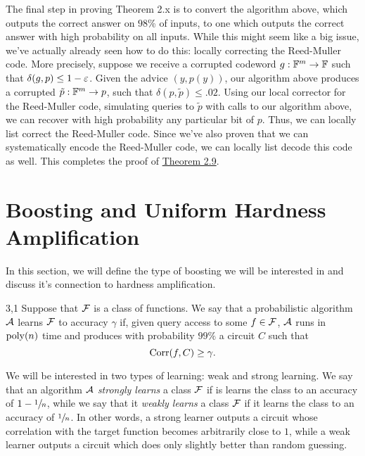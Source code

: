 \documentclass[11pt]{article}
\begin{document}
The final step in proving Theorem 2.x is to convert the algorithm above, which outputs the correct answer on $98$\% of inputs, to one which outputs the correct answer with high probability on all inputs. While this might seem like a big issue, we've actually already seen how to do this: locally correcting the Reed-Muller code. More precisely, suppose we receive a corrupted codeword $g : \mathbb{F}^m \rightarrow \mathbb{F}$ such that $\delta(g, p) \leq 1 - \varepsilon$. Given the advice $(y, p(y))$, our algorithm above produces a corrupted $\tilde{p} : \mathbb{F}^m \rightarrow p$, such that $\delta(p, \tilde{p}) \leq .02$. Using our local corrector for the Reed-Muller code, simulating queries to $\tilde{p}$ with calls to our algorithm above, we can recover with high probability any particular bit of $p$. Thus, we can locally list correct the Reed-Muller code. Since we've also proven that we can systematically encode the Reed-Muller code, we can locally list decode this code as well. This completes the proof of \hyperref[t-2-9]{Theorem 2.9}.

\section{Boosting and Uniform Hardness Amplification}


In this section, we will define the type of boosting we will be interested in and discuss it's connection to hardness amplification.

\begin{definition}{3,1}
    Suppose that $\mathcal{F}$ is a class of functions. We say that a probabilistic algorithm $\mathcal{A}$ learns $\mathcal{F}$ to accuracy $\gamma$ if, given query access to some $f \in \mathcal{F}$, $\mathcal{A}$ runs in $\mathrm{poly}(n)$ time and produces with probability $99\%$ a circuit $C$ such that 
    \begin{equation*}
        \mathrm{Corr}(f, C) \geq \gamma.
    \end{equation*}
\end{definition}
We will be interested in two types of learning: weak and strong learning. We say that an algorithm $\mathcal{A}$ \emph{strongly learns} a class $\mathcal{F}$ if is learns the class to an accuracy of $1 - \sfrac{1}{n}$, while we say that it \emph{weakly learns} a class $\mathcal{F}$ if it learns the class to an accuracy of $\sfrac{1}{n}$. In other words, a strong learner outputs a circuit whose correlation with the target function becomes arbitrarily close to $1$, while a weak learner outputs a circuit which does only slightly better than random guessing.
\end{document}
